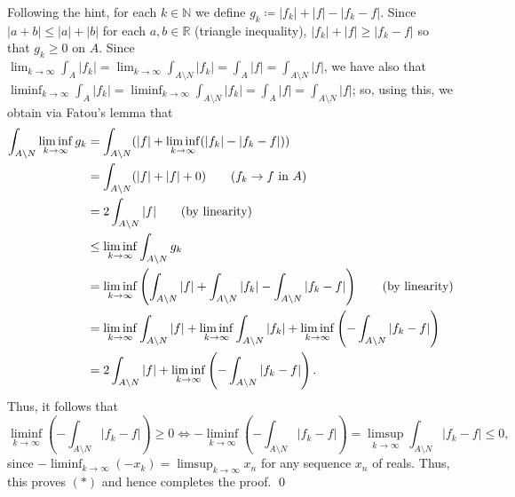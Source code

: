 Following the hint, for each \( k \in \mathbb{N}  \) we define \( g_{k} \coloneqq |f_{k} | + |f| -|f_{k} - f| \). Since \( |a+b| \leq |a| + |b| \) for each \( a,b \in \mathbb{R} \) (triangle inequality), \( |f_{k} | + |f| \geq |f_{k} - f|\) so that \( g_{k} \geq 0 \) on \( A \). Since \( \lim_{{k} \to {\infty}} \int_{A} |f_{k} | = \lim_{{k} \to {\infty}} \int_{A\setminus N} |f_{k} | = \int_{A} |f| = \int_{A \setminus N} |f|\), we have also that \( \liminf _{k \to \infty} \int_{A} |f_{k}| =  \liminf _{k \to \infty} \int_{A \setminus N} |f_{k} | = \int_{A} |f| =  \int_{A\setminus N} |f| \); so, using this, we obtain via Fatou's lemma that
\begin{align*}
	\int_{A \setminus N} \liminf_{k\to \infty} g_{k}  &= \int_{A \setminus N} (|f| + \liminf_{k \to \infty} (|f_{k} | - |f_{k} - f|) ) \\
							  &= \int_{A \setminus N} (|f| + |f| + 0) \tag{\( f_{k} \to f \) in \( A \)}  \\
							  &= 2 \int_{A \setminus N} |f| \tag{by linearity} \\
							  &\leq \liminf_{k \to \infty} \int_{A\setminus N} g_{k} \\
							  &= \liminf_{k\to \infty} \left ( {\int_{A\setminus N} |f| + \int_{A\setminus N} |f_{k}| - \int_{A \setminus N} |f_{k} - f|} \right ) \tag {by linearity}\\
							  &= \liminf_{k \to \infty} \int_{A \setminus N} |f| + \liminf_{k \to \infty} \int_{A\setminus N} |f_{k} |+ \liminf_{k \to \infty} \left(-\int_{A \setminus N} |f_{k} - f|\right ) \\
							  &= 2 \int_{A \setminus N} |f| + \liminf_{k \to \infty} \left ( -\int_{A \setminus N} |f_{k} - f|\right).
\end{align*}
Thus, it follows that \[\liminf_{k \to \infty} \left ( - \int_{A \setminus N} |f_{k} - f| \right) \geq 0 \iff -\liminf_{k \to \infty} \left( - \int_{A \setminus N} |f_{k} - f| \right ) = \limsup_{k \to \infty} \int_{A \setminus N} |f_{k} - f| \leq 0, \] since \( -\liminf_{k \to \infty} (-x_{k} ) = \limsup_{k \to \infty} x_{n}   \) for any sequence \( x_{n}  \) of reals. Thus, this proves \((\ast)\) and hence completes the proof.   \qed

